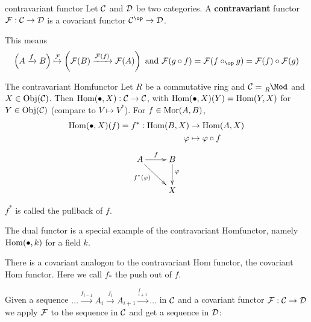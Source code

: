 \documentclass[twoside = false,	%
		headsepline,		%
		parskip = true,
		]{scrbook}						%
\begin{document}
    \begin{definition*}{contravariant functor}
        Let $\mathcal C$ and $\mathcal D$ be two categories. A \textbf{contravariant} functor $\mathcal F: \mathcal C \to \mathcal D$
        is a covariant functor $\cC^\op \to \cD$.
        
        This means
        \begin{equation*}
            \left(A \xrightarrow{f} B\right) \overset{\cF}{\mapsto} \left(\cF(B) \xrightarrow{\cF(f)}\cF(A)\right)
            \text{ and  } \cF(g \circ f) = \cF(f \circ_\op g) = \cF(f) \circ \cF(g)
        \end{equation*}

    \end{definition*}
    
    \begin{example*}{The contravariant Homfunctor}
        Let $R$ be a commutative ring and $\cC = \tensor[_R]{\Mod}{^{}}$ and $X \in \mathrm{Obj}(\mathcal C) $. 
        Then $\mathrm{Hom}(\bullet,X): \mathcal C \to \mathcal C$, with $\mathrm{Hom}(\bullet,X)(Y) = \mathrm{Hom}(Y,X)$ for $Y \in \mathrm{Obj}(\mathcal C)$ (compare to $V \mapsto V^*$).
        For $f \in \mathrm{Mor}(A,B)$,
        \begin{equation*}
            \begin{split}
                \mathrm{Hom}(\bullet,X)(f) = f^*: \mathrm{Hom}(B,X) &\to \mathrm{Hom}(A,X) \\
                \varphi &\mapsto \varphi \circ f  \\
            \end{split}
        \end{equation*}
        \begin{equation*}
            \xymatrix {
                A \ar^{f}[r]\ar_(.4){f^*(\varphi)}[dr] & B\ar^(.4){\varphi}[d] \\
                            & X
            }
        \end{equation*}
        
        $f^*$ is called the pullback of $f$.
    \end{example*}
    
    The dual functor is a special example of the contravariant Homfunctor, namely $\mathrm{Hom}(\bullet,k)$ for a field $k$.
    
    There is a covariant analogon to the contravariant Hom functor, the covariant Hom functor. Here we call $f_*$ the push out of $f$.
    
    Given a sequence $\dots \xrightarrow{f_{i-1}} A_i \xrightarrow{f_i} A_{i+1} \xrightarrow{^f_{i+1}} \dots$
    in $\mathcal C$ and a covariant functor $\mathcal F: \mathcal C \to \mathcal D$ we apply $\mathcal F$ to the sequence in $\mathcal C$ and
    get a sequence in $\mathcal D$:
        
\end{document}
